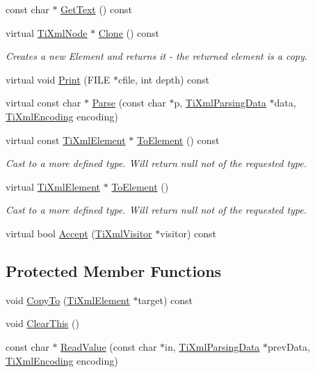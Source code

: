 \begin{DoxyCompactItemize}
\item 
const char $\ast$ \hyperlink{class_ti_xml_element_aa6dedd8a146acf3b1bc0903deb2d411a}{GetText} () const 
\item 
virtual \hyperlink{class_ti_xml_node}{TiXmlNode} $\ast$ \hyperlink{class_ti_xml_element_a13f6df105ebb1e8dc636e75cc883be32}{Clone} () const 
\begin{DoxyCompactList}\small\item\em Creates a new Element and returns it -\/ the returned element is a copy. \item\end{DoxyCompactList}\item 
virtual void \hyperlink{class_ti_xml_element_ad9d0c008866982ab8d9aafae7e14d692}{Print} (FILE $\ast$cfile, int depth) const 
\item 
virtual const char $\ast$ \hyperlink{class_ti_xml_element_af95c9165159fd9dfdcc5b894a3fcf85b}{Parse} (const char $\ast$p, \hyperlink{class_ti_xml_parsing_data}{TiXmlParsingData} $\ast$data, \hyperlink{tinyxml_8h_a88d51847a13ee0f4b4d320d03d2c4d96}{TiXmlEncoding} encoding)
\item 
virtual const \hyperlink{class_ti_xml_element}{TiXmlElement} $\ast$ \hyperlink{class_ti_xml_element_ac5b8d0e25fa23fd9acbb6d146082901c}{ToElement} () const 
\begin{DoxyCompactList}\small\item\em Cast to a more defined type. Will return null not of the requested type. \item\end{DoxyCompactList}\item 
virtual \hyperlink{class_ti_xml_element}{TiXmlElement} $\ast$ \hyperlink{class_ti_xml_element_a9def86337ea7a755eb41cac980f60c7a}{ToElement} ()
\begin{DoxyCompactList}\small\item\em Cast to a more defined type. Will return null not of the requested type. \item\end{DoxyCompactList}\item 
virtual bool \hyperlink{class_ti_xml_element_a31ab28cc3b892a69254391d6bbe08df3}{Accept} (\hyperlink{class_ti_xml_visitor}{TiXmlVisitor} $\ast$visitor) const 
\end{DoxyCompactItemize}
\subsection*{Protected Member Functions}
\begin{DoxyCompactItemize}
\item 
void \hyperlink{class_ti_xml_element_a9e0c1983b840de4134f1f6bf7af00b0f}{CopyTo} (\hyperlink{class_ti_xml_element}{TiXmlElement} $\ast$target) const 
\item 
void \hyperlink{class_ti_xml_element_a5670933ec2d7d9763b9891acc05d7f7d}{ClearThis} ()
\item 
const char $\ast$ \hyperlink{class_ti_xml_element_ac786bce103042d3837c4cc2ff6967d41}{ReadValue} (const char $\ast$in, \hyperlink{class_ti_xml_parsing_data}{TiXmlParsingData} $\ast$prevData, \hyperlink{tinyxml_8h_a88d51847a13ee0f4b4d320d03d2c4d96}{TiXmlEncoding} encoding)
\end{DoxyCompactItemize}
